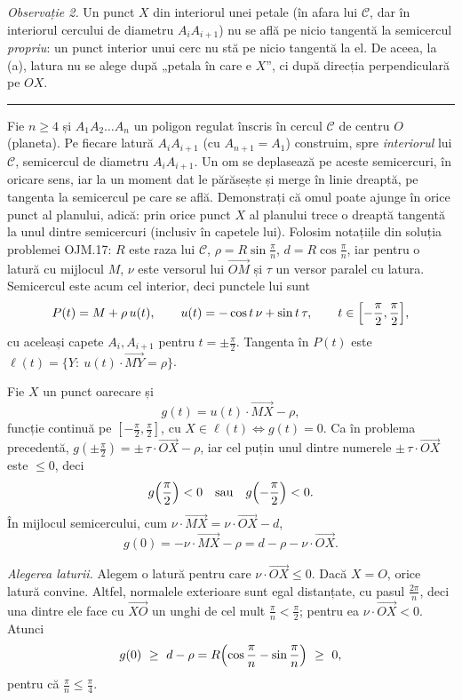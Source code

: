 \emph{Observație 2.} Un punct $X$ din interiorul unei petale (în afara lui $\mathcal C$, dar în interiorul cercului de diametru $A_iA_{i+1}$) nu se află pe nicio tangentă la semicercul \emph{propriu}: un punct interior unui cerc nu stă pe nicio tangentă la el. De aceea, la (a), latura nu se alege după „petala în care e $X$'', ci după direcția perpendiculară pe $OX$.
\vspace{1mm}\hrule

Fie $n\ge4$ și $A_1A_2\ldots A_n$ un poligon regulat înscris în cercul $\mathcal C$ de centru $O$ (planeta). Pe fiecare latură $A_iA_{i+1}$ (cu $A_{n+1}=A_1$) construim, spre \emph{interiorul} lui $\mathcal C$, semicercul de diametru $A_iA_{i+1}$. Un om se deplasează pe aceste semicercuri, în oricare sens, iar la un moment dat le părăsește și merge în linie dreaptă, pe tangenta la semicercul pe care se află. Demonstrați că omul poate ajunge în orice punct al planului, adică: prin orice punct $X$ al planului trece o dreaptă tangentă la unul dintre semicercuri (inclusiv în capetele lui).
\figpetaleint
\sol Folosim notațiile din soluția problemei OJM.17: $R$ este raza lui $\mathcal C$, $\rho=R\sin\frac\pi n$, $d=R\cos\frac\pi n$, iar pentru o latură cu mijlocul $M$, $\nu$ este versorul lui $\overrightarrow{OM}$ și $\tau$ un versor paralel cu latura. Semicercul este acum cel interior, deci punctele lui sunt
\[ P(t)=M+\rho\,u(t),\qquad u(t)=-\cos t\,\nu+\sin t\,\tau,\qquad t\in\Bigl[-\frac\pi2,\frac\pi2\Bigr] , \]
cu aceleași capete $A_i,A_{i+1}$ pentru $t=\pm\frac\pi2$. Tangenta în $P(t)$ este $\ell(t)=\{Y:\ u(t)\cdot\overrightarrow{MY}=\rho\}$.

Fie $X$ un punct oarecare și
\[ g(t)=u(t)\cdot\overrightarrow{MX}-\rho , \]
funcție continuă pe $[-\frac\pi2,\frac\pi2]$, cu $X\in\ell(t)\iff g(t)=0$. Ca în problema precedentă, $g(\pm\frac\pi2)=\pm\,\tau\cdot\overrightarrow{OX}-\rho$, iar cel puțin unul dintre numerele $\pm\,\tau\cdot\overrightarrow{OX}$ este $\le0$, deci
\[ g\Bigl(\frac\pi2\Bigr)<0\quad\text{sau}\quad g\Bigl(-\frac\pi2\Bigr)<0 . \]
În mijlocul semicercului, cum $\nu\cdot\overrightarrow{MX}=\nu\cdot\overrightarrow{OX}-d$,
\[ g(0)=-\nu\cdot\overrightarrow{MX}-\rho=d-\rho-\nu\cdot\overrightarrow{OX} . \]

\emph{Alegerea laturii.} Alegem o latură pentru care $\nu\cdot\overrightarrow{OX}\le0$. Dacă $X=O$, orice latură convine. Altfel, normalele exterioare sunt egal distanțate, cu pasul $\frac{2\pi}n$, deci una dintre ele face cu $\overrightarrow{XO}$ un unghi de cel mult $\frac\pi n<\frac\pi2$; pentru ea $\nu\cdot\overrightarrow{OX}<0$. Atunci
\[ g(0)\ \ge\ d-\rho=R\Bigl(\cos\frac\pi n-\sin\frac\pi n\Bigr)\ \ge\ 0 , \]
pentru că $\frac\pi n\le\frac\pi4$.

